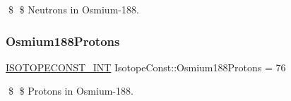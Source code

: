 \$ \$ Neutrons in Osmium-\/188. \mbox{\label{group___isotope_const-_osmium-_os188_gaa9364d56a5377ef4c4057d6fd68436e2}} 
\subsubsection{\texorpdfstring{Osmium188\+Protons}{Osmium188Protons}}
{\footnotesize\ttfamily \mbox{\hyperlink{group___isotope_const-_macros_ga5f18360b3e99483a35c32d789e62621c}{I\+S\+O\+T\+O\+P\+E\+C\+O\+N\+S\+T\+\_\+\+I\+NT}} Isotope\+Const\+::\+Osmium188\+Protons = 76}

\$ \$ Protons in Osmium-\/188. 